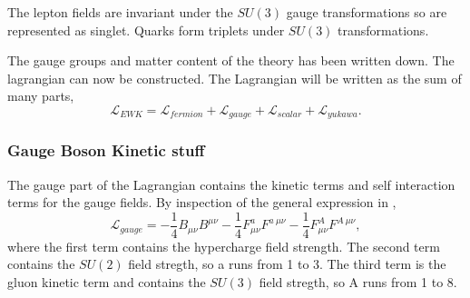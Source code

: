 The lepton fields are invariant under the $SU(3)$ gauge transformations so are
represented as singlet. Quarks form triplets under $SU(3)$ transformations.

The gauge groups and matter content of the theory has been written down. 
The lagrangian can now be constructed.
The Lagrangian will be written as the sum of many parts,
\begin{equation}
\mathcal{L}_{EWK} = 
\mathcal{L}_{fermion}
+ \mathcal{L}_{gauge}
+ \mathcal{L}_{scalar}
+ \mathcal{L}_{yukawa}.
\end{equation}

\subsubsection{Gauge Boson Kinetic stuff}
The gauge part of the Lagrangian contains the kinetic terms and self interaction
terms for the gauge fields. By inspection of the general expression in
,
\begin{equation}
\mathcal{L}_{gauge} = 
- \frac{1}{4} B_{\mu\nu} B^{\mu\nu}
- \frac{1}{4} F^{a}_{\mu\nu} F^{a~\mu\nu}
- \frac{1}{4} F^{A}_{\mu\nu} F^{A~\mu\nu},
\end{equation}
where the first term contains the hypercharge field strength. 
The second term 
contains the $SU(2)$ field stregth, so a runs from 1 to 3.
The third term is the gluon kinetic term and 
contains the $SU(3)$ field stregth, so A runs from 1 to 8.

